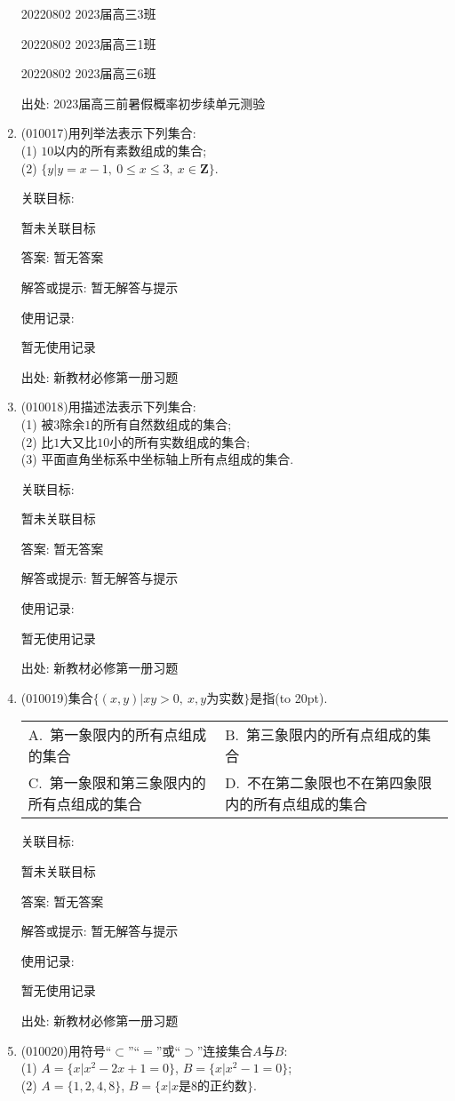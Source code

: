 \documentclass[10pt,a4paper]{article}
\newcommand{\bracket}[1]{(\hbox to #1pt{})}
\newcommand{\twoch}[4]{\par\begin{tabular}{p{.46\textwidth}p{.46\textwidth}}
A.~#1& B.~#2\\
C.~#3& D.~#4
\end{tabular}}
\begin{document}
\begin{enumerate}[1.]
20220802	2023届高三3班		

20220802	2023届高三1班		

20220802	2023届高三6班		


出处: 2023届高三前暑假概率初步续单元测验
\item { (010017)}用列举法表示下列集合:\\
(1) $10$以内的所有素数组成的集合;\\
(2) $\{y|y=x-1,\  0\le x\le 3,\ x\in \mathbf{Z}\}$.


关联目标:

暂未关联目标

答案: 暂无答案

解答或提示: 暂无解答与提示

使用记录:

暂无使用记录


出处: 新教材必修第一册习题
\item { (010018)}用描述法表示下列集合:\\
(1) 被$3$除余$1$的所有自然数组成的集合;\\
(2) 比$1$大又比$10$小的所有实数组成的集合;\\
(3) 平面直角坐标系中坐标轴上所有点组成的集合.


关联目标:

暂未关联目标

答案: 暂无答案

解答或提示: 暂无解答与提示

使用记录:

暂无使用记录


出处: 新教材必修第一册习题
\item { (010019)}集合$\{(x, y)|xy>0, \ x,y\text{为实数}\}$是指\bracket{20}.
\twoch{第一象限内的所有点组成的集合}{第三象限内的所有点组成的集合}{第一象限和第三象限内的所有点组成的集合}{不在第二象限也不在第四象限内的所有点组成的集合}


关联目标:

暂未关联目标

答案: 暂无答案

解答或提示: 暂无解答与提示

使用记录:

暂无使用记录


出处: 新教材必修第一册习题
\item { (010020)}用符号``$\subset$''``$=$''或``$\supset$''连接集合$A$与$B$:\\
(1) $A=\{x|x^2-2x+1=0\}$, $B=\{x|x^2-1=0\}$;\\
(2) $A=\{1, 2, 4, 8\}$, $B=\{x|x$是$8$的正约数$\}$.



\end{enumerate}
\end{document}

